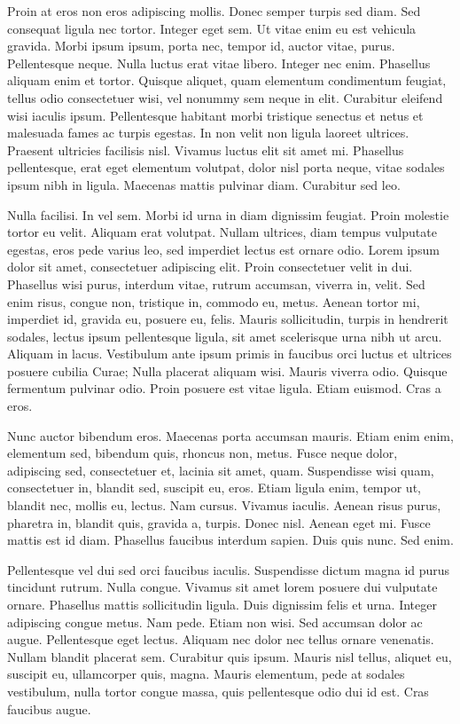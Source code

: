 Proin at eros non eros adipiscing mollis. Donec semper turpis sed diam. Sed
consequat ligula nec tortor. Integer eget sem. Ut vitae enim eu est vehicula
gravida. Morbi ipsum ipsum, porta nec, tempor id, auctor vitae, purus.
Pellentesque neque. Nulla luctus erat vitae libero. Integer nec enim. Phasellus
aliquam enim et tortor. Quisque aliquet, quam elementum condimentum feugiat,
tellus odio consectetuer wisi, vel nonummy sem neque in elit. Curabitur
eleifend wisi iaculis ipsum. Pellentesque habitant morbi tristique senectus et
netus et malesuada fames ac turpis egestas. In non velit non ligula laoreet
ultrices. Praesent ultricies facilisis nisl. Vivamus luctus elit sit amet mi.
Phasellus pellentesque, erat eget elementum volutpat, dolor nisl porta neque,
vitae sodales ipsum nibh in ligula. Maecenas mattis pulvinar diam. Curabitur
sed leo.

Nulla facilisi. In vel sem. Morbi id urna in diam dignissim feugiat. Proin
molestie tortor eu velit. Aliquam erat volutpat. Nullam ultrices, diam tempus
vulputate egestas, eros pede varius leo, sed imperdiet lectus est ornare odio.
Lorem ipsum dolor sit amet, consectetuer adipiscing elit. Proin consectetuer
velit in dui. Phasellus wisi purus, interdum vitae, rutrum accumsan, viverra
in, velit. Sed enim risus, congue non, tristique in, commodo eu, metus. Aenean
tortor mi, imperdiet id, gravida eu, posuere eu, felis. Mauris sollicitudin,
turpis in hendrerit sodales, lectus ipsum pellentesque ligula, sit amet
scelerisque urna nibh ut arcu. Aliquam in lacus. Vestibulum ante ipsum primis
in faucibus orci luctus et ultrices posuere cubilia Curae; Nulla placerat
aliquam wisi. Mauris viverra odio. Quisque fermentum pulvinar odio. Proin
posuere est vitae ligula. Etiam euismod. Cras a eros.

Nunc auctor bibendum eros. Maecenas porta accumsan mauris. Etiam enim enim,
elementum sed, bibendum quis, rhoncus non, metus. Fusce neque dolor, adipiscing
sed, consectetuer et, lacinia sit amet, quam. Suspendisse wisi quam,
consectetuer in, blandit sed, suscipit eu, eros. Etiam ligula enim, tempor ut,
blandit nec, mollis eu, lectus. Nam cursus. Vivamus iaculis. Aenean risus
purus, pharetra in, blandit quis, gravida a, turpis. Donec nisl. Aenean eget
mi. Fusce mattis est id diam. Phasellus faucibus interdum sapien. Duis quis
nunc. Sed enim.

Pellentesque vel dui sed orci faucibus iaculis. Suspendisse dictum magna id
purus tincidunt rutrum. Nulla congue. Vivamus sit amet lorem posuere dui
vulputate ornare. Phasellus mattis sollicitudin ligula. Duis dignissim felis et
urna. Integer adipiscing congue metus. Nam pede. Etiam non wisi. Sed accumsan
dolor ac augue. Pellentesque eget lectus. Aliquam nec dolor nec tellus ornare
venenatis. Nullam blandit placerat sem. Curabitur quis ipsum. Mauris nisl
tellus, aliquet eu, suscipit eu, ullamcorper quis, magna. Mauris elementum,
pede at sodales vestibulum, nulla tortor congue massa, quis pellentesque odio
dui id est. Cras faucibus augue.

